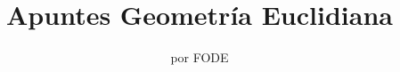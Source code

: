 \normalfont

\author{\Large  por FODE}
\title{Apuntes Geometría Euclidiana\\}
\date{}
\pagestyle{empty}
\maketitle
\thispagestyle{empty}
\let\cleardoublepage\clearpage
\tableofcontents								%


 
\let\cleardoublepage\clearpage
